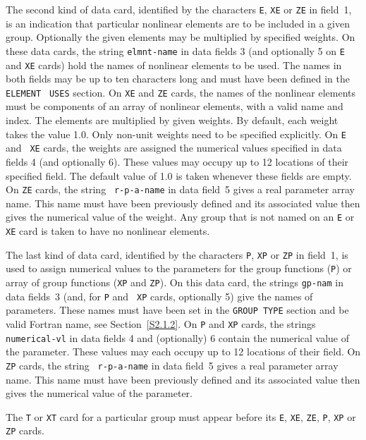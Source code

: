 \documentclass[a4paper]{article}
\begin{document}
The second kind  of data card,
identified by the characters {\tt  E},
{\tt  XE} or   {\tt ZE}
in  field~1, is  an indication that particular
nonlinear elements are to be included in a given group. Optionally the
given elements may be multiplied by specified weights.
On these data cards,
the string {\tt elmnt-name} in data fields 3 (and optionally 5
on {\tt E} and  {\tt XE} cards) hold  the names of nonlinear  elements
to be used.   The names in both  fields  may  be up to ten
characters long and  must have been defined  in the {\tt ELEMENT} {\tt
USES} section.  On  {\tt  XE}  and {\tt ZE}  cards, the  names  of the
nonlinear  elements must  be   components  of an   array
of nonlinear
elements, with a valid name
and index.  The elements are multiplied by
given weights. By  default,
each  weight takes  the  value 1.0.  Only
non-unit weights need to be specified explicitly.  On {\tt E} and {\tt
XE} cards,
the weights are assigned the  numerical values specified in
data fields  4  (and optionally 6). These  values may occupy up  to 12
locations of their specified field.  The default value of 1.0
is taken
whenever these fields are empty.   On {\tt ZE}  cards, the string {\tt
r-p-a-name} in  data field~5 gives  a real parameter   array name.
This name  must have been previously defined  and its associated value
then gives the numerical value of  the weight.  Any  group that is not
named  on an {\tt E} or  {\tt XE} card
is taken  to have no nonlinear elements.

The last kind of data card,
identified by the characters {\tt P}, {\tt XP} or {\tt ZP}
in field~1, is used to  assign numerical values to the
parameters  for  the group
functions ({\tt   P})  or  array
of  group
functions ({\tt XP} and {\tt ZP}). On this data card,
the strings {\tt gp-nam} in data  fields~3 (and, for {\tt P}  and {\tt
XP}  cards, optionally 5)  give the names  of  parameters.
These names
must have been set in the {\tt GROUP TYPE}
section and be valid Fortran  name,
see
Section~\ref{S2.1.2}.  On {\tt P} and {\tt XP} cards, the strings {\tt
numerical-vl} in  data   fields 4 and  (optionally)  6  contain the
numerical value of the parameter.  These values may  each occupy up to
12  locations  of their  field.  On {\tt  ZP} cards, the  string  {\tt
r-p-a-name} in data field~5 gives   a  real  parameter
array  name.
This name must have been  previously defined  and its associated value
then gives the numerical value of the parameter.

The {\tt T} or {\tt XT} card
for a particular group
must appear before its {\tt E}, {\tt XE}, {\tt ZE}, {\tt  P}, {\tt XP}
or {\tt ZP} cards.
\end{document}
